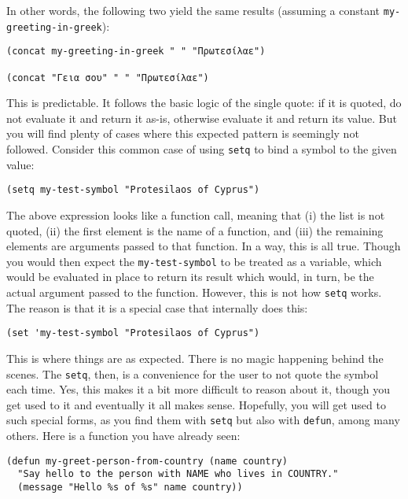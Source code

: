 \documentclass[11pt]{ctexart}
\begin{document}
In other words, the following two yield the same results (assuming a constant \texttt{my-greeting-in-greek}):

\begin{verbatim}
(concat my-greeting-in-greek " " "Πρωτεσίλαε")

(concat "Γεια σου" " " "Πρωτεσίλαε")
\end{verbatim}

This is predictable. It follows the basic logic of the single quote: if it is quoted, do not evaluate it and return it as-is, otherwise evaluate it and return its value. But you will find plenty of cases where this expected pattern is seemingly not followed. Consider this common case of using \texttt{setq} to bind a symbol to the given value:

\begin{verbatim}
(setq my-test-symbol "Protesilaos of Cyprus")
\end{verbatim}

The above expression looks like a function call, meaning that (i) the list is not quoted, (ii) the first element is the name of a function, and (iii) the remaining elements are arguments passed to that function. In a way, this is all true. Though you would then expect the \texttt{my-test-symbol} to be treated as a variable, which would be evaluated in place to return its result which would, in turn, be the actual argument passed to the function. However, this is not how \texttt{setq} works. The reason is that it is a special case that internally does this:

\begin{verbatim}
(set 'my-test-symbol "Protesilaos of Cyprus")
\end{verbatim}

This is where things are as expected. There is no magic happening behind the scenes. The \texttt{setq}, then, is a convenience for the user to not quote the symbol each time. Yes, this makes it a bit more difficult to reason about it, though you get used to it and eventually it all makes sense. Hopefully, you will get used to such special forms, as you find them with \texttt{setq} but also with \texttt{defun}, among many others. Here is a function you have already seen:

\begin{verbatim}
(defun my-greet-person-from-country (name country)
  "Say hello to the person with NAME who lives in COUNTRY."
  (message "Hello %s of %s" name country))
\end{verbatim}
\end{document}
